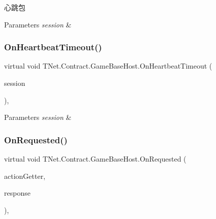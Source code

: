 心跳包 


\begin{DoxyParams}{Parameters}
{\em session} & \\
\hline
\end{DoxyParams}
\mbox{\label{class_t_net_1_1_contract_1_1_game_base_host_a191e95fd9011f435370a84f22a15c3ff}} 
\subsubsection{\texorpdfstring{On\+Heartbeat\+Timeout()}{OnHeartbeatTimeout()}}
{\footnotesize\ttfamily virtual void T\+Net.\+Contract.\+Game\+Base\+Host.\+On\+Heartbeat\+Timeout (\begin{DoxyParamCaption}\item[{\mbox{\hyperlink{class_t_net_1_1_contract_1_1_game_session}{Game\+Session}}}]{session }\end{DoxyParamCaption})\hspace{0.3cm}{\ttfamily [protected]}, {\ttfamily [virtual]}}






\begin{DoxyParams}{Parameters}
{\em session} & \\
\hline
\end{DoxyParams}
\mbox{\label{class_t_net_1_1_contract_1_1_game_base_host_a2a726288c921c8743a426fbc3ae2ccb9}} 
\subsubsection{\texorpdfstring{On\+Requested()}{OnRequested()}}
{\footnotesize\ttfamily virtual void T\+Net.\+Contract.\+Game\+Base\+Host.\+On\+Requested (\begin{DoxyParamCaption}\item[{\mbox{\hyperlink{class_t_net_1_1_service_1_1_action_getter}{Action\+Getter}}}]{action\+Getter,  }\item[{\mbox{\hyperlink{class_t_net_1_1_service_1_1_base_game_response}{Base\+Game\+Response}}}]{response }\end{DoxyParamCaption})\hspace{0.3cm}{\ttfamily [protected]}, {\ttfamily [virtual]}}



